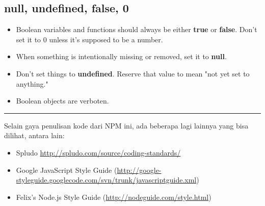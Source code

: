 \subsection{null, undefined, false, 0}

\begin{itemize}
  \item Boolean variables and functions should always be either \textbf{true} or \textbf{false}. Don't set it to 0 unless it's supposed to be a number.
  \item When something is intentionally missing or removed, set it to \textbf{null}.
  \item Don't set things to \textbf{undefined}. Reserve that value to mean "not yet set to anything."
  \item Boolean objects are verboten.
\end{itemize}    

\vspace{10mm}
\hrule
\vspace{10mm}

Selain gaya penulisan kode dari NPM ini, ada beberapa lagi lainnya yang bisa dilihat, antara lain:

\begin{itemize}
  \item Spludo \url{http://spludo.com/source/coding-standards/}
  \item Google JavaScript Style Guide (\url{http://google-styleguide.googlecode.com/svn/trunk/javascriptguide.xml})
  \item Felix's Node.js Style Guide (\url{http://nodeguide.com/style.html})
\end{itemize}

